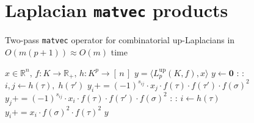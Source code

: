 \documentclass[10pt]{article}
\numberwithin{equation}{section}
\newcommand{\+}{%
	\raisebox{0.18ex}{\scaleobj{0.55}{+}}
}
\theoremstyle{definition}
\begin{document}
\section{Laplacian \texttt{matvec} products}\label{sec:up_laplace_matvec}
\begin{algorithm}
\caption{Two-pass \texttt{matvec} operator for combinatorial up-Laplacians in $O(m(p+1)) \approx O(m)$ time }	
\begin{algorithmic}
\Require $x \in \mathbb{R}^n, \, f: K \to \mathbb{R}_{+}, \, h: K^p \to [\,n\,]$
\Ensure $y = \langle L_p^{\mathrm{up}}(K, f), x \rangle$
\vspace{0.25em}
\State $y \gets \mathbf{0}$ 
:
    : %
	    	\State $i, j \gets h(\tau), \; h(\tau')$ %
    		\State $y_{i} \mathrel{{+}{=}} (-1)^{s_{ij}} \cdot x_{j} \cdot f(\tau) \cdot f(\tau') \cdot f(\sigma)^2$
    		\State $y_{j} \mathrel{{+}{=}} (-1)^{s_{ij}} \cdot x_{i} \cdot f(\tau) \cdot f(\tau') \cdot f(\sigma)^2$
    \EndFor 
\EndFor
{}: 
	\For{$\tau \in \partial[\sigma]$}:
		\State $i \gets h(\tau)$
   	 	\State $y_{i} \mathrel{{+}{=}} x_i \cdot f(\sigma)^2 \cdot f(\tau)^2$
   	\EndFor
\EndFor
\Return $y$
\EndFunction
\end{algorithmic}
\end{algorithm}
\end{document}
